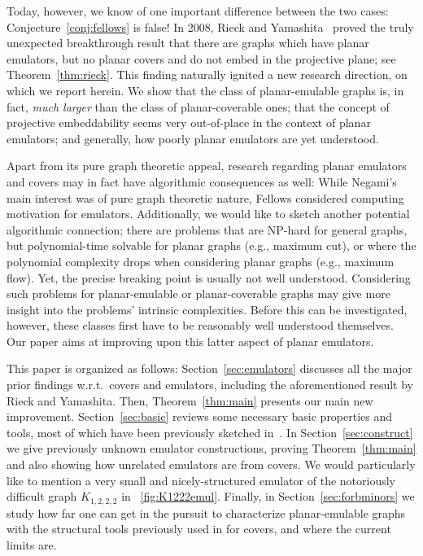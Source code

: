 \documentclass[envcountsect,envcountsame]{llncs}
\begin{document}
Today, however, we know of one important difference between the two
cases: Conjecture~\ref{conj:fellows} is false!
In 2008, Rieck and Yamashita~\cite{cit:rieck} proved
the truly unexpected breakthrough result that there are graphs which have 
planar emulators, but no planar covers and do not embed in the projective plane;
see Theorem~\ref{thm:rieck}.
This finding naturally ignited a new research direction, on which we report
herein. 
We show that the class of planar-emulable graphs is, in fact, 
\emph{much larger} than the class of planar-coverable ones; that the concept of
projective embeddability seems very out-of-place in the context of planar
emulators; and generally, how poorly planar emulators are yet understood.

\medskip
Apart from its pure graph theoretic appeal, research regarding planar emulators and
covers may in fact have algorithmic consequences as well: While Negami's main
interest \cite{cit:double} was of pure graph theoretic nature, Fellows 
\cite[and personal communication]{cit:fellows} considered
computing motivation for emulators.
Additionally, we would like to sketch another potential algorithmic connection; 
there are problems that are NP-hard for general graphs, 
but polynomial-time solvable for planar graphs (e.g., maximum cut), or
where the polynomial complexity drops when considering planar graphs (e.g.,
maximum flow). 
Yet, the precise breaking point is usually not well understood.
Considering such problems for planar-emulable or planar-coverable graphs may
give more insight into the problems' intrinsic complexities. Before this can be
investigated, however, these classes first have to be reasonably well understood
themselves. 
Our paper aims at improving upon this latter aspect of planar emulators.

This paper is organized as follows:
Section~\ref{sec:emulators} discusses all the major prior findings 
w.r.t.\ covers and emulators, including the aforementioned result by Rieck and Yamashita.
Then, Theorem~\ref{thm:main} presents our main new improvement.
Section~\ref{sec:basic} reviews some necessary basic properties and tools,
most of which have been previously sketched in~\cite{cit:femul}.
In Section~\ref{sec:construct} we give previously unknown emulator
constructions, proving Theorem~\ref{thm:main} and also
showing how unrelated emulators are from covers. 
We would particularly like to mention a very small and nicely-structured emulator of
the notoriously difficult graph $K_{1,2,2,2}$ in
\figurename~\ref{fig:K1222emul}.
Finally, in Section~\ref{sec:forbminors} we study how far one can get in the
pursuit to characterize planar-emulable graphs with the structural tools previously
used in \cite{cit:counterex} for covers, and where the current limits are.
\end{document}
